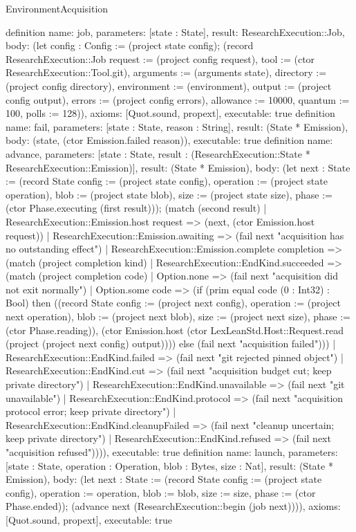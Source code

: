\begin{lexlean}{EnvironmentAcquisition}
\begin{semanticmodule}
{}
definition{
 name: job, parameters: [state : State], result: ResearchExecution::Job,
 body: (let config : Config := (project state config); (record ResearchExecution::Job {request := (project config request), tool := (ctor ResearchExecution::Tool.git), arguments := (arguments state), directory := (project config directory), environment := (environment), output := (project config output), errors := (project config errors), allowance := 10000, quantum := 100, polls := 128})), axioms: [Quot.sound, propext], executable: true
}
definition{
 name: fail, parameters: [state : State, reason : String], result: (State * Emission),
 body: (state, (ctor Emission.failed reason)), executable: true
}
definition{
 name: advance, parameters: [state : State, result : (ResearchExecution::State * ResearchExecution::Emission)], result: (State * Emission),
 body: (let next : State := (record State {config := (project state config), operation := (project state operation), blob := (project state blob), size := (project state size), phase := (ctor Phase.executing (first result))}); (match (second result) | ResearchExecution::Emission.host request => (next, (ctor Emission.host request)) | ResearchExecution::Emission.awaiting => (fail next "acquisition has no outstanding effect") | ResearchExecution::Emission.complete completion => (match (project completion kind) | ResearchExecution::EndKind.succeeded => (match (project completion code) | Option.none => (fail next "acquisition did not exit normally") | Option.some code => (if (prim equal code (0 : Int32) : Bool) then ((record State {config := (project next config), operation := (project next operation), blob := (project next blob), size := (project next size), phase := (ctor Phase.reading)}), (ctor Emission.host (ctor LexLeanStd.Host::Request.read (project (project next config) output)))) else (fail next "acquisition failed"))) | ResearchExecution::EndKind.failed => (fail next "git rejected pinned object") | ResearchExecution::EndKind.cut => (fail next "acquisition budget cut; keep private directory") | ResearchExecution::EndKind.unavailable => (fail next "git unavailable") | ResearchExecution::EndKind.protocol => (fail next "acquisition protocol error; keep private directory") | ResearchExecution::EndKind.cleanupFailed => (fail next "cleanup uncertain; keep private directory") | ResearchExecution::EndKind.refused => (fail next "acquisition refused")))), executable: true
}
definition{
 name: launch, parameters: [state : State, operation : Operation, blob : Bytes, size : Nat], result: (State * Emission),
 body: (let next : State := (record State {config := (project state config), operation := operation, blob := blob, size := size, phase := (ctor Phase.ended)}); (advance next (ResearchExecution::begin (job next)))), axioms: [Quot.sound, propext], executable: true
}
\end{semanticmodule}
\end{lexlean}
